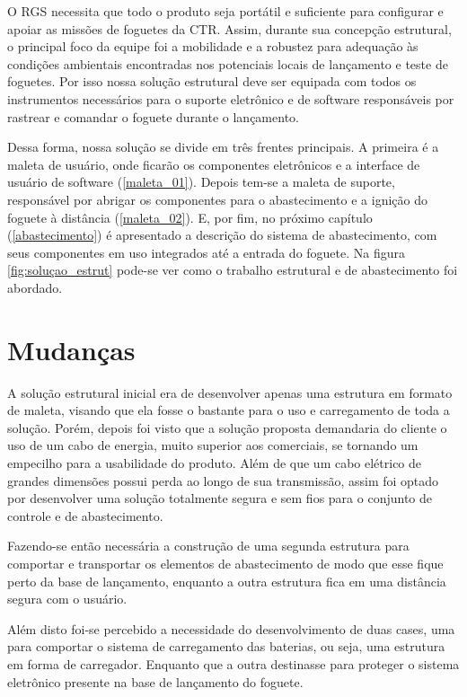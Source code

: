 \par O RGS necessita que todo o produto seja portátil e suficiente para configurar e apoiar as missões de foguetes da CTR. Assim, durante sua concepção estrutural, o principal foco da equipe foi a mobilidade e a robustez para adequação às condições ambientais encontradas nos potenciais locais de lançamento e teste de foguetes. Por isso nossa solução estrutural deve ser equipada com todos os instrumentos necessários para o suporte eletrônico e de software responsáveis por rastrear e comandar o foguete durante o lançamento.

\par Dessa forma, nossa solução se divide em três frentes principais. A primeira é a maleta de usuário, onde ficarão os componentes eletrônicos e a interface de usuário de software (\ref{maleta_01}). Depois tem-se a maleta de suporte, responsável por abrigar os componentes para o abastecimento e a ignição do foguete à distância (\ref{maleta_02}). E, por fim, no próximo capítulo (\ref{abastecimento}) é apresentado a descrição do sistema de abastecimento, com seus componentes em uso integrados até a entrada do foguete. Na figura \ref{fig:soluçao_estrut} pode-se ver como o trabalho estrutural e de abastecimento foi abordado.


\section{Mudanças}
\label{sec:mud_est}

\par A solução estrutural inicial era de desenvolver apenas uma estrutura em formato de maleta, visando que ela fosse o bastante para o uso e carregamento de toda a solução. Porém, depois foi visto que a solução proposta demandaria do cliente o uso de um cabo de energia, muito superior aos comerciais, se tornando um empecilho para a usabilidade do produto. Além de que um cabo elétrico de grandes dimensões possui perda ao longo de sua transmissão, assim foi optado por desenvolver uma solução totalmente segura e sem fios para o conjunto de controle e de abastecimento. 

\par Fazendo-se então necessária a construção de uma segunda estrutura para comportar e transportar os elementos de abastecimento de modo que esse fique perto da base de lançamento, enquanto a outra estrutura fica em uma distância segura com o usuário.

\par Além disto foi-se percebido a necessidade do desenvolvimento de duas cases, uma para comportar o sistema de carregamento das baterias, ou seja, uma estrutura em forma de carregador. Enquanto que a outra destinasse para proteger o sistema eletrônico presente na base de lançamento do foguete.

